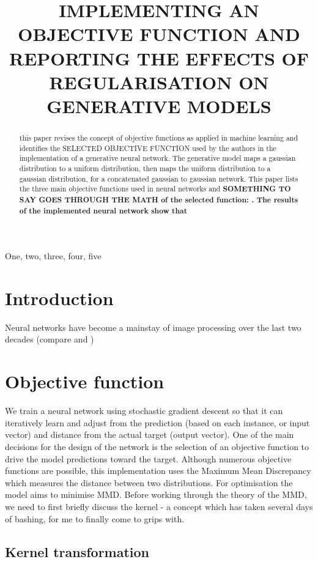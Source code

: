 \documentclass{article}
\title{IMPLEMENTING AN OBJECTIVE FUNCTION AND REPORTING THE EFFECTS OF REGULARISATION ON GENERATIVE MODELS}
\begin{document}
%
\maketitle
%
\begin{abstract}
this paper revises the concept of objective functions as applied in machine learning and identifies the SELECTED OBJECTIVE FUNCTION used by the authors in the implementation of a generative neural network.  The generative model maps a gaussian distribution to a uniform distribution, then maps the uniform distribution to a gaussian distribution, for a concatenated gaussian to gaussian network.  This paper lists the three main objective functions used in neural networks and \bf{SOMETHING TO SAY GOES THROUGH THE MATH of the selected function:  .}  The results of the implemented neural network show that 
\end{abstract}
%
\begin{keywords}
One, two, three, four, five
\end{keywords}
%
\section{Introduction}
\label{sec:intro}
%
Neural networks have become a mainstay of image processing over the last two decades (compare \cite{parisi1998car} and \cite{naranjo2020review}) 

\section{Objective function}
\label{sec:format}

We train a neural network using stochastic gradient descent so that it can iteratively learn and adjust from the prediction (based on each instance, or input vector) and distance from the actual target (output vector).  One of the main decisions for the design of the network is the selection of an objective function to drive the model predictions toward the target.  Although numerous objective functions are possible, this implementation uses the Maximum Mean Discrepancy which measures the distance between two distributions.  For optimisation the model aims to minimise MMD.  Before working through the theory of the MMD, we need to first briefly discuss the kernel - a concept which has taken several days of bashing, for me to finally come to grips with.  

\subsection{Kernel transformation}
\label{ssec:kernel}
\end{document}
